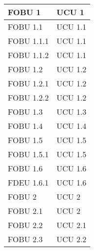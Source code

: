 \begin{longtable}{XX}
FOBU 1&UCU 1\\
\midrule
FOBU 1.1&UCU 1.1\\
\midrule
FOBU 1.1.1&UCU 1.1\\
\midrule
FOBU 1.1.2&UCU 1.1\\
\midrule
FOBU 1.2&UCU 1.2\\
\midrule
FOBU 1.2.1&UCU 1.2\\
\midrule
FOBU 1.2.2&UCU 1.2\\
\midrule
FOBU 1.3&UCU 1.3\\
\midrule
FOBU 1.4&UCU 1.4\\
\midrule
FOBU 1.5&UCU 1.5\\
\midrule
FOBU 1.5.1&UCU 1.5\\
\midrule
FOBU 1.6&UCU 1.6\\
\midrule
FDEU 1.6.1&UCU 1.6\\
\midrule
FOBU 2&UCU 2\\
\midrule
FOBU 2.1&UCU 2\\
\midrule
FOBU 2.2&UCU 2.1\\
\midrule
FOBU 2.3&UCU 2.2\\
\midrule


\end{longtable}
